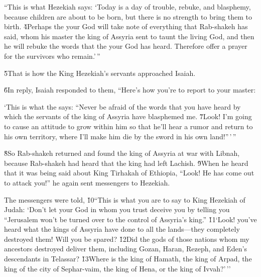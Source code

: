 \begin{poetry}
\poeml ``This is what Hezekiah says: `Today is a day of trouble, rebuke, and blasphemy, because children are about to be born, but there is no strength to bring them to birth. \v{4}Perhaps the  your God will take note of everything that Rab-shakeh has said, whom his master the king of Assyria sent to taunt the living God, and then he will rebuke the words that the  your God has heard. Therefore offer a prayer for the survivors who remain.'\,''
\end{poetry}

\v{5}That is how the King Hezekiah's servants approached Isaiah.

\v{6}In reply, Isaiah responded to them, ``Here's how you're to report to your master:

\begin{poetry}
\poeml `This is what the  says: ``Never be afraid of the words that you have heard by which the servants of the king of Assyria have blasphemed me. \v{7}Look! I'm going to cause an attitude to grow within him so that he'll hear a rumor and return to his own territory, where I'll make him die by the sword in his own land!''\,'\,''
\end{poetry}

\v{8}So Rab-shakeh returned and found the king of Assyria at war with Libnah, because Rab-shakeh had heard that the king had left Lachish. \v{9}When he heard that it was being said about King Tirhakah of Ethiopia, ``Look! He has come out to attack you!'' he again sent messengers to Hezekiah.

The messengers were told, \v{10}``This is what you are to say to King Hezekiah of Judah: `Don't let your God in whom you trust deceive you by telling you ``Jerusalem won't be turned over to the control of Assyria's king.'' \v{11}`Look! you've heard what the kings of Assyria have done to all the lands---they completely destroyed them! Will you be spared? \v{12}Did the gods of those nations whom my ancestors destroyed deliver them, including Gozan, Haran, Rezeph, and Eden's descendants in Telassar? \v{13}Where is the king of Hamath, the king of Arpad, the king of the city of Sephar-vaim, the king of Hena, or the king of Ivvah?'\,''

